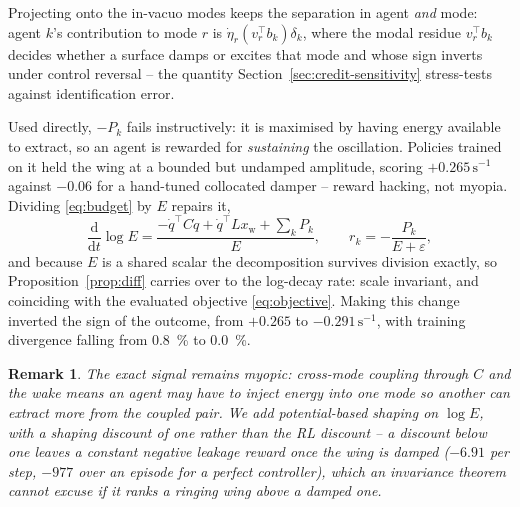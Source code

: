 \documentclass[preprint,11pt]{elsarticle}
\newtheorem{remark}{Remark}
\begin{document}
Projecting onto the in-vacuo modes keeps the separation in agent \emph{and}
mode: agent $k$'s contribution to mode $r$ is $\dot\eta_r (v_r^{\top}
b_k)\delta_k$, where the modal residue $v_r^{\top} b_k$ decides whether a
surface damps or excites that mode and whose sign inverts under control
reversal -- the quantity Section~\ref{sec:credit-sensitivity} stress-tests
against identification error.

Used directly, $-P_k$ fails instructively: it is maximised by having energy
available to extract, so an agent is rewarded for \emph{sustaining} the
oscillation. Policies trained on it held the wing at a bounded but undamped
amplitude, scoring $+0.265\,\mathrm{s}^{-1}$ against $-0.06$ for a
hand-tuned collocated damper -- reward hacking, not myopia. Dividing
\eqref{eq:budget} by $E$ repairs it,
\begin{equation}
\frac{\mathrm{d}}{\mathrm{d}t}\log E
= \frac{-\dot q^{\top} C \dot q + \dot q^{\top} L x_{\mathrm{w}} + \sum_k P_k}{E},
\qquad
r_k = -\frac{P_k}{E + \varepsilon},
\label{eq:logcredit}
\end{equation}
\label{sec:log}
and because $E$ is a shared scalar the decomposition survives division
exactly, so Proposition~\ref{prop:diff} carries over to the log-decay rate:
scale invariant, and coinciding with the evaluated objective
\eqref{eq:objective}. Making this change inverted the sign of the outcome,
from $+0.265$ to $-0.291\,\mathrm{s}^{-1}$, with training divergence
falling from \SI{0.8}{\percent} to \SI{0.0}{\percent}.

\begin{remark}
The exact signal remains myopic: cross-mode coupling through $C$ and the
wake means an agent may have to inject energy into one mode so another can
extract more from the coupled pair. We add potential-based shaping
\cite{ng1999shaping} on $\log E$, with a shaping discount of one rather
than the RL discount -- a discount below one leaves a constant negative
leakage reward once the wing is damped ($-6.91$ per step, $-977$ over an
episode for a perfect controller), which an invariance theorem cannot
excuse if it ranks a ringing wing above a damped one.
\end{remark}
\end{document}
